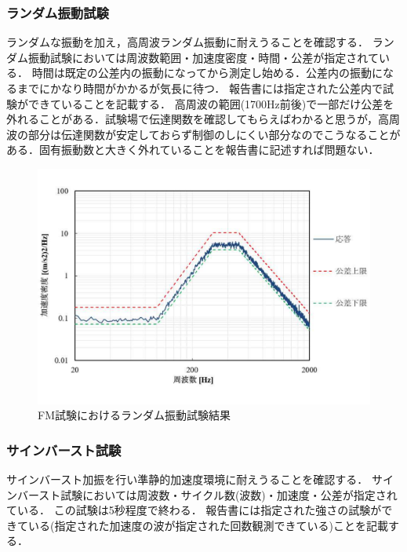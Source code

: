 \subsubsection{ランダム振動試験}
ランダムな振動を加え，高周波ランダム振動に耐えうることを確認する．
ランダム振動試験においては周波数範囲・加速度密度・時間・公差が指定されている．
時間は既定の公差内の振動になってから測定し始める．公差内の振動になるまでにかなり時間がかかるが気長に待つ．
報告書には指定された公差内で試験ができていることを記載する．
高周波の範囲(1700Hz前後)で一部だけ公差を外れることがある．試験場で伝達関数を確認してもらえばわかると思うが，高周波の部分は伝達関数が安定しておらず制御のしにくい部分なのでこうなることがある．固有振動数と大きく外れていることを報告書に記述すれば問題ない．

\begin{figure}[H]
	\centering
	\includegraphics[width=1\linewidth]{04/fig/4-3-5.pdf}
	\caption{FM試験におけるランダム振動試験結果\cite{FM_vibration_test_report}}
	\label{fig4-3-1}
\end{figure}

\subsubsection{サインバースト試験}
サインバースト加振を行い準静的加速度環境に耐えうることを確認する．
サインバースト試験においては周波数・サイクル数(波数)・加速度・公差が指定されている．
この試験は5秒程度で終わる．
報告書には指定された強さの試験ができている(指定された加速度の波が指定された回数観測できている)ことを記載する．


